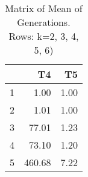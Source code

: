 \begin{table}[ht]
\centering
\begin{tabular}{rrr}
  \hline
 & T4 & T5 \\ 
  \hline
1 & 1.00 & 1.00 \\ 
  2 & 1.01 & 1.00 \\ 
  3 & 77.01 & 1.23 \\ 
  4 & 73.10 & 1.20 \\ 
  5 & 460.68 & 7.22 \\ 
   \hline
\end{tabular}
\caption{Matrix of Mean of Generations.  Rows: k=2, 3, 4, 5, 6)} 
\end{table}
